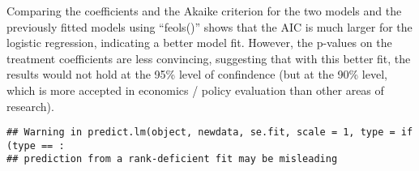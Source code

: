 \documentclass[
]{article}
\newenvironment{Shaded}{\begin{snugshade}}{\end{snugshade}}
\newcommand{\AttributeTok}[1]{\textcolor[rgb]{0.77,0.63,0.00}{#1}}
\newcommand{\CommentTok}[1]{\textcolor[rgb]{0.56,0.35,0.01}{\textit{#1}}}
\newcommand{\FunctionTok}[1]{\textcolor[rgb]{0.00,0.00,0.00}{#1}}
\newcommand{\NormalTok}[1]{#1}
\newcommand{\OtherTok}[1]{\textcolor[rgb]{0.56,0.35,0.01}{#1}}
\newcommand{\SpecialCharTok}[1]{\textcolor[rgb]{0.00,0.00,0.00}{#1}}
\begin{document}
\begin{Shaded}
\end{Shaded}

Comparing the coefficients and the Akaike criterion for the two models
and the previously fitted models using ``feols()'' shows that the AIC is
much larger for the logistic regression, indicating a better model fit.
However, the p-values on the treatment coefficients are less convincing,
suggesting that with this better fit, the results would not hold at the
95\% level of confindence (but at the 90\% level, which is more accepted
in economics / policy evaluation than other areas of research).

\begin{verbatim}
## Warning in predict.lm(object, newdata, se.fit, scale = 1, type = if (type == :
## prediction from a rank-deficient fit may be misleading
\end{verbatim}
\end{document}
